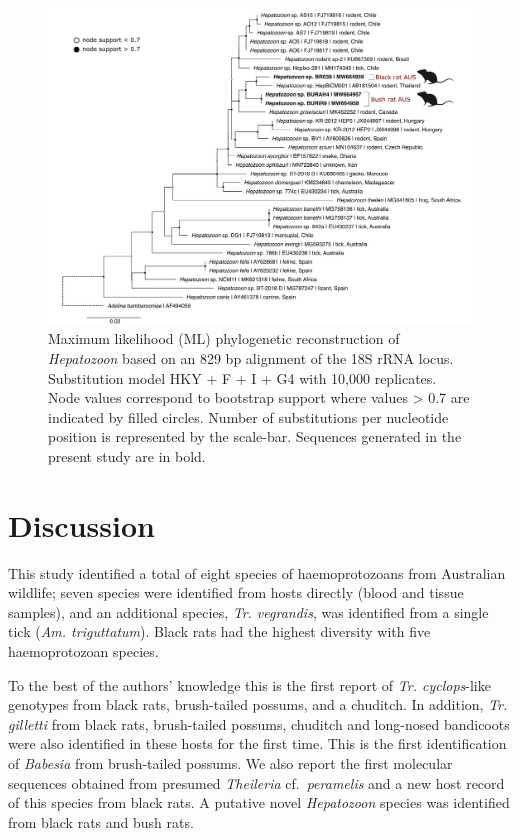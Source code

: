 \documentclass[a4paper, nobind]{templates/ociamthesis}
\begin{document}
\begin{figure}
\includegraphics[width=0.95\linewidth]{figures/ms-figs/Ch4-hepattree} \caption[Phylogeny of \textit{Hepatozoon} species.]{Maximum likelihood (ML) phylogenetic reconstruction of \textit{Hepatozoon} based on an 829 bp alignment of the 18S rRNA locus. Substitution model HKY + F + I + G4 with 10,000 replicates. Node values correspond to bootstrap support where values > 0.7 are indicated by filled circles. Number of substitutions per nucleotide position is represented by the scale-bar. Sequences generated in the present study are in bold.}\label{fig:F4hepattree}
\end{figure}

\hypertarget{discussion-1}{%
\section{Discussion}\label{discussion-1}}

This study identified a total of eight species of haemoprotozoans from Australian wildlife; seven species were identified from hosts directly (blood and tissue samples), and an additional species, \emph{Tr. vegrandis}, was identified from a single tick (\emph{Am. triguttatum}). Black rats had the highest diversity with five haemoprotozoan species.

To the best of the authors' knowledge this is the first report of \emph{Tr. cyclops}-like genotypes from black rats, brush-tailed possums, and a chuditch.
In addition, \emph{Tr. gilletti} from black rats, brush-tailed possums, chuditch and long-nosed bandicoots were also identified in these hosts for the first time. This is the first identification of \emph{Babesia} from brush-tailed possums. We also report the first molecular sequences obtained from presumed \emph{Theileria} cf.~\emph{peramelis} and a new host record of this species from black rats. A putative novel \emph{Hepatozoon} species was identified from black rats and bush rats.
\end{document}
